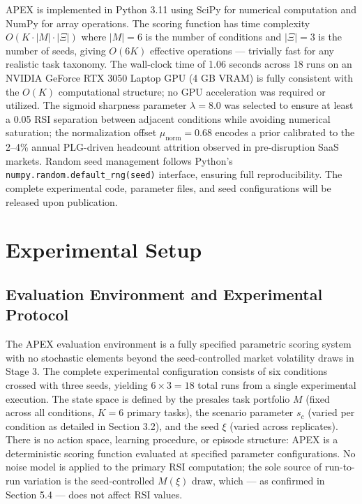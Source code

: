 \documentclass[10pt, conference]{IEEEtran}
\begin{document}
APEX is implemented in Python 3.11 using SciPy \cite{virtanen2020scipy} for numerical computation and NumPy for array operations. The scoring function has time complexity $O(K \cdot |M| \cdot |\Xi|)$ where $|M| = 6$ is the number of conditions and $|\Xi| = 3$ is the number of seeds, giving $O(6K)$ effective operations --- trivially fast for any realistic task taxonomy. The wall-clock time of 1.06 seconds across 18 runs on an NVIDIA GeForce RTX 3050 Laptop GPU (4 GB VRAM) is fully consistent with the $O(K)$ computational structure; no GPU acceleration was required or utilized. The sigmoid sharpness parameter $\lambda = 8.0$ was selected to ensure at least a 0.05 RSI separation between adjacent conditions while avoiding numerical saturation; the normalization offset $\mu_{\text{norm}} = 0.68$ encodes a prior calibrated to the 2--4\% annual PLG-driven headcount attrition observed in pre-disruption SaaS markets. Random seed management follows Python's \texttt{numpy.random.default\_rng(seed)} interface, ensuring full reproducibility. The complete experimental code, parameter files, and seed configurations will be released upon publication.

\section{Experimental Setup}

\label{sec:experimental_setup}

\subsection{Evaluation Environment and Experimental Protocol}

\label{sec:evaluation_environment_and_experimental_}

The APEX evaluation environment is a fully specified parametric scoring system with no stochastic elements beyond the seed-controlled market volatility draws in Stage 3. The complete experimental configuration consists of six conditions crossed with three seeds, yielding $6 \times 3 = 18$ total runs from a single experimental execution. The state space is defined by the presales task portfolio $M$ (fixed across all conditions, $K = 6$ primary tasks), the scenario parameter $s_c$ (varied per condition as detailed in Section 3.2), and the seed $\xi$ (varied across replicates). There is no action space, learning procedure, or episode structure: APEX is a deterministic scoring function evaluated at specified parameter configurations. No noise model is applied to the primary RSI computation; the sole source of run-to-run variation is the seed-controlled $M(\xi)$ draw, which --- as confirmed in Section 5.4 --- does not affect RSI values.
\end{document}
